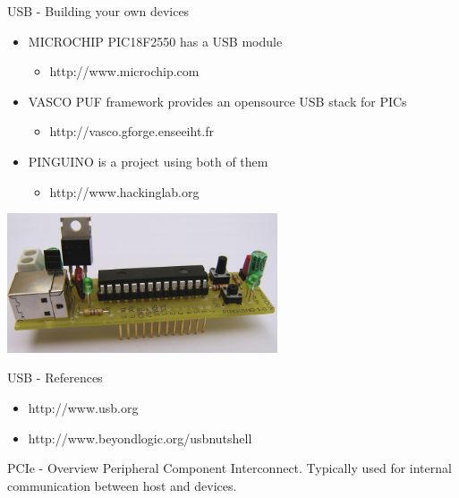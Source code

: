 \begin{frame}{USB - Building your own devices}
  \begin{itemize}
  \item MICROCHIP PIC18F2550 has a USB module
    \begin{itemize}
    \item http://www.microchip.com
    \end{itemize}
  \item VASCO PUF framework provides an opensource USB stack for PICs
    \begin{itemize}
    \item http://vasco.gforge.enseeiht.fr
    \end{itemize}
  \item PINGUINO is a project using both of them
    \begin{itemize}
    \item http://www.hackinglab.org
    \end{itemize}
  \end{itemize}

  \smallskip
  \begin{center}
    \includegraphics[width=0.6\textwidth]{figures/pinguino.jpg}
  \end{center}

\end{frame}

\begin{frame}{USB - References}
  \begin{itemize}
  \item http://www.usb.org
  \item http://www.beyondlogic.org/usbnutshell
  \end{itemize}
\end{frame}


\begin{frame}{PCIe - Overview}
  Peripheral Component Interconnect. Typically used for internal communication
  between host and devices.
\end{frame}

